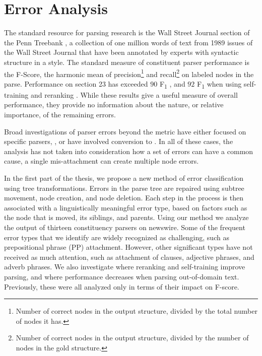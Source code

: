 \section{Error Analysis}

The standard resource for parsing research is the Wall Street Journal section of the Penn Treebank \parencite{ptb}, a collection of one million words of text from 1989 issues of the Wall Street Journal that have been annotated by experts with syntactic structure in a \gb style.
The standard measure of constituent parser performance is the F-Score, the harmonic mean of precision\footnote{
Number of correct nodes in the output structure, divided by the total number of nodes it has.
} and recall\footnote{
Number of correct nodes in the output structure, divided by the number of nodes in the gold structure.
} on labeled nodes in the parse.
Performance on \wsj section 23 has exceeded $90$ F\textsubscript{1} \parencite{Petrov-Klein:2007}, and $92$ F\textsubscript{1} when using self-training and reranking \parencite{McClosky-Charniak-Johnson:2006,Charniak-Johnson:2005}. 
While these results give a useful measure of overall performance, they provide no information about the nature, or relative importance, of the remaining errors.

Broad investigations of parser errors beyond the \parseval metric \parencite{Black-etal:1991} have either focused on specific parsers, \myeg \parencite{Collins:2003}, or have involved conversion to \depgr \parencite{Carroll-etal:1998,King:2003}.
In all of these cases, the analysis has not taken into consideration how a set of errors can have a common cause, \myeg a single mis-attachment can create multiple node errors.

In the first part of the thesis, we propose a new method of error classification using tree transformations.
Errors in the parse tree are repaired using subtree movement, node creation, and node deletion.
Each step in the process is then associated with a linguistically meaningful error type, based on factors such as the node that is moved, its siblings, and parents.  
Using our method we analyze the output of thirteen constituency parsers on newswire.
Some of the frequent error types that we identify are widely recognized as challenging, such as prepositional phrase (PP) attachment.
However, other significant types have not received as much attention, such as attachment of clauses, adjective phrases, and adverb phrases.
We also investigate where reranking and self-training improve parsing, and where performance decreases when parsing out-of-domain text.
Previously, these were all analyzed only in terms of their impact on F-score.

